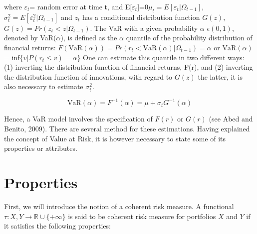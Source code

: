 \documentclass[a4paper,11pt,oneside]{book}
\begin{document}
where $\varepsilon_t$= random error at time t, and E[$\varepsilon_t$]=0\newline $\mu_t= E[\varepsilon_t|\Omega_{t-1}]$, $\sigma^2_t = E[\varepsilon^2_t|\Omega_{t-1}]$ and $z_t$ has a conditional distribution function $G(z)$, $G(z) = Pr(z_t < z|\Omega_{t-1})$. The VaR with a given probability $\alpha$ $\epsilon(0,1)$, denoted by VaR($\alpha$), is defined as the $\alpha$ quantile of the probability distribution of financial returns:\newline
$F(\text{VaR}(\alpha))=Pr(r_t < \text{VaR}(\alpha)|\Omega_{t-1})=\alpha$ or $\text{VaR}(\alpha)$ = inf$\{v|P(r_t \leq v)= \alpha\}$
\newline\newline
One can estimate this quantile in two different ways: (1) inverting the distribution function of financial returns, F(r), and (2)
inverting the distribution function of innovations, with regard to
$G(z)$ the latter, it is also necessary to estimate $\sigma^2_t$. 

\begin{equation}
\text{VaR} (\alpha) = F^{-1}(\alpha) = \mu + \sigma_tG^{-1}(\alpha)
\label{2}
\end{equation}

Hence, a VaR model involves the specification of $F(r)$ or $G(r)$ (see Abed and Benito, 2009). There are several method for these estimations. Having explained the concept of Value at Risk, it is however necessary to state some of its properties or attributes.



\section{Properties}

First, we will introduce the notion of a coherent risk measure. A functional $\tau: X,Y \rightarrow \mathbb{R} \cup \{+\infty\}$ is said to be coherent risk measure for portfolios $X$ and $Y$ if it satisfies the following properties:
\end{document}
